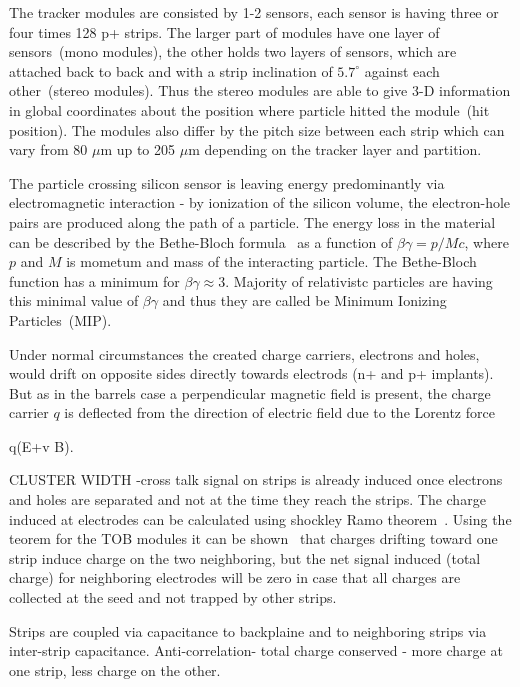 The tracker modules are consisted by 1-2 sensors, each sensor is having three or four times 128 p+ strips. The larger part of modules have one layer of sensors~(mono modules), the other holds two layers of sensors, which are attached back to back and with a strip inclination of $5.7^{\circ}$ against each other~(stereo modules). Thus the stereo modules are able to give 3-D information in global coordinates about the position where particle hitted the module~(hit position). The modules also differ by the pitch size between each strip which can vary from 80 $\mu$m up to 205 $\mu$m depending on the tracker layer and partition.

The particle crossing silicon sensor is leaving energy predominantly via electromagnetic interaction - by ionization of the silicon volume, the electron-hole pairs are produced along the path of a particle. The energy loss in the material can be described by the Bethe-Bloch formula~\cite{Groom:2000sm} as a function of $\beta\gamma = p/Mc$, where $p$ and $M$ is mometum and mass of the interacting particle. The Bethe-Bloch function has a minimum for $\beta\gamma \approx 3$. Majority of relativistc particles are having this minimal value of $\beta\gamma$ and thus they are called be Minimum Ionizing Particles~(MIP).

Under normal circumstances the created charge carriers, electrons and holes, would drift on opposite sides directly towards electrods (n+ and p+ implants). But as in the barrels case a perpendicular magnetic field is present, the charge carrier $q$ is deflected from the direction of electric field due to the Lorentz force

{
    q(E+v \times B).
}


CLUSTER WIDTH
-cross talk
signal on strips is already induced once electrons and holes are separated and not at the time they reach the strips. The charge induced at electrodes can be calculated using shockley Ramo theorem~\cite{doi:10.1063/1.1710367,Ramo:1939vr}. Using the teorem for the TOB modules it can be shown~\cite{Bloch:2007zza} that charges drifting toward one strip induce charge on the two neighboring, but the net signal induced (total charge) for neighboring electrodes will be zero in case that all charges are collected at the seed and not trapped by other strips.

Strips are coupled via capacitance to backplaine and to neighboring strips via inter-strip capacitance. Anti-correlation- total charge conserved - more charge at one strip, less charge on the other.

